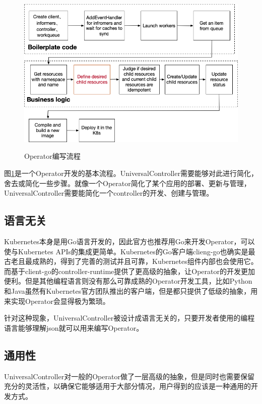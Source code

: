 \documentclass[macfonts,master]{njuthesis}
\begin{document}
\begin{figure}[htbp]
  \centering
  \includegraphics[width= 1\textwidth]{pics/coding-operator.png}\\
  \caption{Operator编写流程}\label{fig:coding-operator}
\end{figure}

图\ref{fig:coding-operator}是一个Operator开发的基本流程。UniversalController需要能够对此进行简化，舍去或简化一些步骤。就像一个Operator简化了某个应用的部署、更新与管理，UniversalController需要能简化一个controller的开发、创建与管理。

\subsection{语言无关}
Kubernetes本身是用Go语言开发的，因此官方也推荐用Go来开发Operator，可以使与Kubernetes APIs的集成更简单。Kubernetes的Go客户端clieng-go也确实是最古老且最成熟的，得到了完善的测试并且可靠，Kubernetes组件内部也会使用它。而基于client-go的controller-runtime提供了更高级的抽象，让Operator的开发更加便利。但是其他编程语言则没有那么可靠成熟的Operator开发工具，比如Python和Java虽然有Kubernetes官方团队推出的客户端，但是都只提供了低级的抽象，用来实现Operator会显得极为繁琐。

针对这种现象，UniversalController被设计成语言无关的，只要开发者使用的编程语言能够理解json就可以用来编写Operator。

\subsection{通用性}
UniversalController对一般的Operator做了一层高级的抽象，但是同时也需要保留充分的灵活性，以确保它能够适用于大部分情况，用户得到的应该是一种通用的开发方式。
\end{document}
